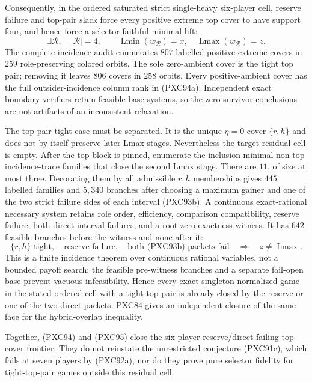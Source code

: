\documentclass[11pt]{article}
\newcommand{\Lmin}{\operatorname{Lmin}}
\newcommand{\Lmax}{\operatorname{Lmax}}
\begin{document}
Consequently, in the ordered saturated strict single-heavy six-player cell,
reserve failure and top-pair slack force every positive extreme top cover to
have support four, and hence force a selector-faithful minimal lift:
\[
 \exists\mathcal R,\quad |\mathcal R|=4,\qquad
 \Lmin(w_{\mathcal R})=x,
 \quad\Lmax(w_{\mathcal R})=z.                       \tag{PXC94c}
\]
The complete incidence audit enumerates $807$ labelled positive extreme
covers in $259$ role-preserving colored orbits.  The sole zero-ambient cover
is the tight top pair; removing it leaves $806$ covers in $258$ orbits.
Every positive-ambient cover has the full outsider-incidence column rank in
(PXC94a).  Independent exact boundary verifiers retain feasible base systems,
so the zero-survivor conclusions are not artifacts of an inconsistent
relaxation.

The top-pair-tight case must be separated.  It is the unique $\eta=0$ cover
$\{r,h\}$ and does not by itself preserve later Lmax stages.  Nevertheless the
target residual cell is empty.  After the top block is pinned, enumerate the
inclusion-minimal non-top incidence-trace families that close the second Lmax
stage.  There are $11$, of size at most three.  Decorating them by all
admissible $r,h$ memberships gives $445$ labelled families and $5{,}340$
branches after choosing a maximum gainer and one of the two strict failure
sides of each interval (PXC93b).  A continuous exact-rational necessary
system retains role order, efficiency, comparison compatibility, reserve
failure, both direct-interval failures, and a root-zero exactness witness.
It has $642$ feasible branches before the witness and none after it:
\[
 \{r,h\}\text{ tight},\quad\text{reserve failure},\quad
 \text{both (PXC93b) packets fail}
 \quad\Longrightarrow\quad z\ne\Lmax.               \tag{PXC95}
\]
This is a finite incidence theorem over continuous rational variables, not a
bounded payoff search; the feasible pre-witness branches and a separate
fail-open base prevent vacuous infeasibility.  Hence every exact
singleton-normalized game in the stated ordered cell with a tight top pair is
already closed by the reserve or one of the two direct packets.  PXC84 gives
an independent closure of the same face for the hybrid-overlap inequality.

Together, (PXC94) and (PXC95) close the six-player reserve/direct-failing
top-cover frontier.  They do not reinstate the unrestricted conjecture
(PXC91c), which fails at seven players by (PXC92a), nor do they prove pure
selector fidelity for tight-top-pair games outside this residual cell.
\end{document}
